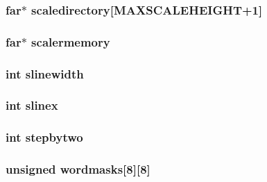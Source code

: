 \label{CONTIGSC_8C_ac10b61c2a588ba00d9ecda54429e0a9d}
\hypertarget{CONTIGSC_8C_aef72729fea30b6e44686fff7019cef9f}{
\subsubsection[{scaledirectory}]{ far$\ast$ {\bf scaledirectory}\mbox{[}MAXSCALEHEIGHT+1\mbox{]}}}
\label{CONTIGSC_8C_aef72729fea30b6e44686fff7019cef9f}
\hypertarget{CONTIGSC_8C_aaf286380af29be7798468a08b72ceb01}{
\subsubsection[{scalermemory}]{ far$\ast$ {\bf scalermemory}}}
\label{CONTIGSC_8C_aaf286380af29be7798468a08b72ceb01}
\hypertarget{CONTIGSC_8C_abd65d74dcd32e5501a3ecec638d65b0e}{
\subsubsection[{slinewidth}]{\setlength{\rightskip}{0pt plus 5cm}int {\bf slinewidth}}}
\label{CONTIGSC_8C_abd65d74dcd32e5501a3ecec638d65b0e}
\hypertarget{CONTIGSC_8C_aaec68c7e7f5e78b99df5b9ed716b35d2}{
\subsubsection[{slinex}]{\setlength{\rightskip}{0pt plus 5cm}int {\bf slinex}}}
\label{CONTIGSC_8C_aaec68c7e7f5e78b99df5b9ed716b35d2}
\hypertarget{CONTIGSC_8C_aa80a217b0adae9ee21e078108c9ef3c5}{
\subsubsection[{stepbytwo}]{\setlength{\rightskip}{0pt plus 5cm}int {\bf stepbytwo}}}
\label{CONTIGSC_8C_aa80a217b0adae9ee21e078108c9ef3c5}
\hypertarget{CONTIGSC_8C_a1c8053b1c5185cc1701015d26ca61eb0}{
\subsubsection[{wordmasks}]{\setlength{\rightskip}{0pt plus 5cm}unsigned {\bf wordmasks}\mbox{[}8\mbox{]}\mbox{[}8\mbox{]}}}
